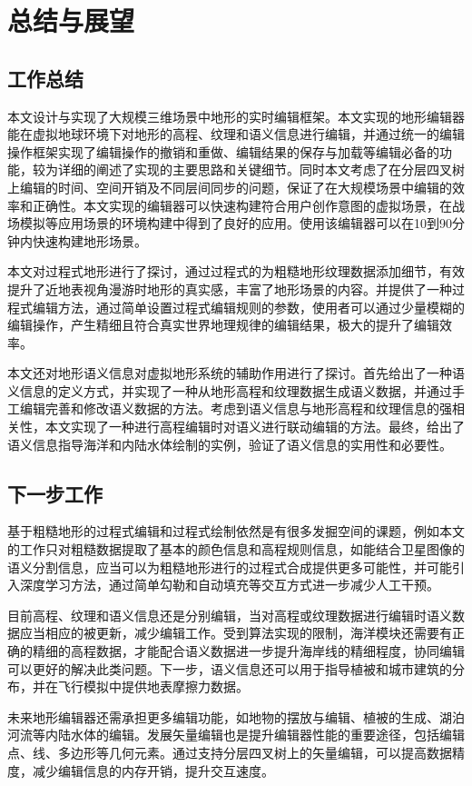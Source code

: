 
\chapter{总结与展望}
\section{工作总结}
本文设计与实现了大规模三维场景中地形的实时编辑框架。本文实现的地形编辑器能在虚拟地球环境下对地形的高程、纹理和语义信息进行编辑，并通过统一的编辑操作框架实现了编辑操作的撤销和重做、编辑结果的保存与加载等编辑必备的功能，较为详细的阐述了实现的主要思路和关键细节。同时本文考虑了在分层四叉树上编辑的时间、空间开销及不同层间同步的问题，保证了在大规模场景中编辑的效率和正确性。本文实现的编辑器可以快速构建符合用户创作意图的虚拟场景，在战场模拟等应用场景的环境构建中得到了良好的应用。使用该编辑器可以在10到90分钟内快速构建地形场景。\par
本文对过程式地形进行了探讨，通过过程式的为粗糙地形纹理数据添加细节，有效提升了近地表视角漫游时地形的真实感，丰富了地形场景的内容。并提供了一种过程式编辑方法，通过简单设置过程式编辑规则的参数，使用者可以通过少量模糊的编辑操作，产生精细且符合真实世界地理规律的编辑结果，极大的提升了编辑效率。\par
本文还对地形语义信息对虚拟地形系统的辅助作用进行了探讨。首先给出了一种语义信息的定义方式，并实现了一种从地形高程和纹理数据生成语义数据，并通过手工编辑完善和修改语义数据的方法。考虑到语义信息与地形高程和纹理信息的强相关性，本文实现了一种进行高程编辑时对语义进行联动编辑的方法。最终，给出了语义信息指导海洋和内陆水体绘制的实例，验证了语义信息的实用性和必要性。
\section{下一步工作}
基于粗糙地形的过程式编辑和过程式绘制依然是有很多发掘空间的课题，例如本文的工作只对粗糙数据提取了基本的颜色信息和高程规则信息，如能结合卫星图像的语义分割信息，应当可以为粗糙地形进行的过程式合成提供更多可能性，并可能引入深度学习方法，通过简单勾勒和自动填充等交互方式进一步减少人工干预。\par
目前高程、纹理和语义信息还是分别编辑，当对高程或纹理数据进行编辑时语义数据应当相应的被更新，减少编辑工作。受到算法实现的限制，海洋模块还需要有正确的精细的高程数据，才能配合语义数据进一步提升海岸线的精细程度，协同编辑可以更好的解决此类问题。下一步，语义信息还可以用于指导植被和城市建筑的分布，并在飞行模拟中提供地表摩擦力数据。\par
未来地形编辑器还需承担更多编辑功能，如地物的摆放与编辑、植被的生成、湖泊河流等内陆水体的编辑。发展矢量编辑也是提升编辑器性能的重要途径，包括编辑点、线、多边形等几何元素。通过支持分层四叉树上的矢量编辑，可以提高数据精度，减少编辑信息的内存开销，提升交互速度。

